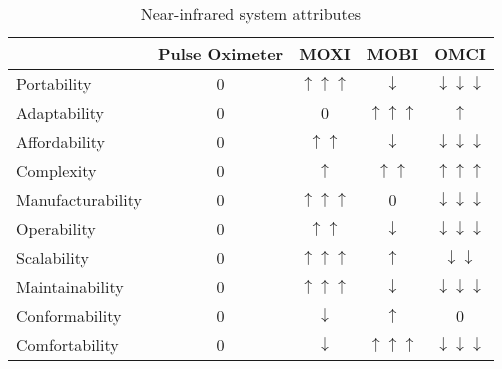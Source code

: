 \begin{table}[]
\centering
\caption{Near-infrared system attributes}
\label{tab:pughtable}
\begin{tabular}{@{}lcccc@{}}
\toprule
                  & Pulse Oximeter & MOXI                      & MOBI                      & OMCI                            \\ \midrule
Portability       & 0              & $\uparrow \uparrow \uparrow$ & $\downarrow$               & $\downarrow \downarrow \downarrow$ \\
Adaptability      & 0              & 0                         & $\uparrow \uparrow \uparrow$ & $\uparrow$                       \\
Affordability     & 0              & $\uparrow \uparrow$         & $\downarrow$               & $\downarrow \downarrow \downarrow$ \\
Complexity        & 0              & $\uparrow$                 & $\uparrow \uparrow$         & $\uparrow \uparrow \uparrow$       \\
Manufacturability & 0              & $\uparrow \uparrow \uparrow$ & 0                         & $\downarrow \downarrow \downarrow$ \\
Operability       & 0              & $\uparrow \uparrow$         & $\downarrow$               & $\downarrow \downarrow \downarrow$ \\
Scalability       & 0              & $\uparrow \uparrow \uparrow$ & $\uparrow$                 & $\downarrow \downarrow$           \\
Maintainability   & 0              & $\uparrow \uparrow \uparrow$ & $\downarrow$               & $\downarrow \downarrow \downarrow$ \\
Conformability    & 0              & $\downarrow$               & $\uparrow$                 & 0                               \\
Comfortability    & 0              & $\downarrow$               & $\uparrow \uparrow \uparrow$ & $\downarrow \downarrow \downarrow$ \\ \bottomrule
\end{tabular}
\end{table}

